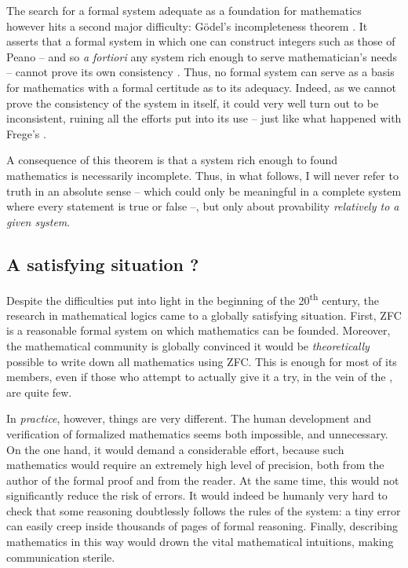 The search for a formal system adequate as a foundation for mathematics however hits a
second major difficulty: Gödel’s incompleteness theorem . It asserts
that a formal system in which one can construct integers such as those of Peano – and so
\textit{a fortiori} any system rich enough to serve mathematician’s needs – cannot
prove its own consistency%
.
Thus, no formal system can serve as a basis for mathematics
with a formal certitude as to its adequacy.
Indeed, as we cannot prove the consistency of the system in itself, it could very well
turn out to be inconsistent, ruining all the efforts put into its use – just like what
happened with Frege’s .

A consequence of this theorem is that a system rich enough to found mathematics is
necessarily incomplete.%
Thus, in what follows, I will never refer to truth in an absolute sense – which could
only be meaningful in a complete system where every statement is true or false –, but
only about provability \emph{relatively to a given system}.

\subsection{A satisfying situation ?}

Despite the difficulties put into light in the beginning of the 20\textsuperscript{th}
century, the research in mathematical logics came to a globally satisfying situation.
First, ZFC is a reasonable formal system on which mathematics can be founded. Moreover,
the mathematical community is globally convinced it would be \emph{theoretically} possible
to write down all mathematics using ZFC. This is enough for most of its members,
even if those who attempt to actually give it a try, in the vein of the
, are quite few.

In \emph{practice}, however, things are very different. The human development and
verification of formalized mathematics%
seems both impossible, and unnecessary.
On the one hand, it would demand a considerable effort, because such mathematics would
require an extremely high level of precision, both from the author of the formal proof
and from the reader. At the same time, this would not significantly reduce the risk of
errors. It would indeed be humanly very hard to check that some reasoning doubtlessly
follows the rules of the system: a tiny error can easily creep inside thousands of pages
of formal reasoning. Finally, describing mathematics in this way would drown the vital
mathematical intuitions, making communication sterile.

